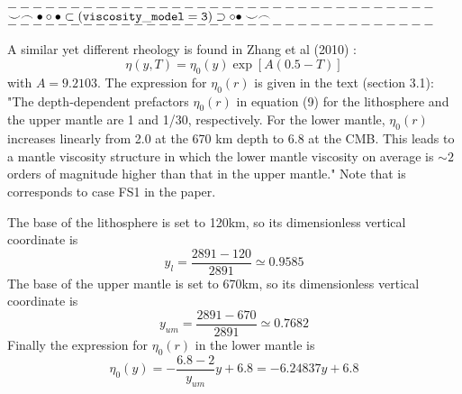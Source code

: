 












\newpage
\begin{center}
$----------------------------------$\\
$\smile \frown \bullet \circ \bullet \subset ( {\tt viscosity\_model=3} ) \supset \circ \bullet \smile \frown$\\
$----------------------------------$
\end{center}


A similar yet different rheology is found in Zhang et al (2010) \cite{zhzl10}:
\[
\eta(y,T) = \eta_0(y) \exp [A(0.5-T)]
\]
with $A=9.2103$. The expression for $\eta_0(r)$ is given in the text (section 3.1):
"The depth‐dependent prefactors $\eta_0(r)$ in equation (9)
for the lithosphere and the upper mantle are 1 and 1/30,
respectively. For the lower mantle, $\eta_0(r)$ increases
linearly from 2.0 at the 670 km depth to 6.8 at the CMB. This
leads to a mantle viscosity structure in which the lower mantle
viscosity on average is $\sim 2$ orders of magnitude higher than
that in the upper mantle." Note that is corresponds to case FS1 in the paper. 

The base of the lithosphere is set to 120km, so its dimensionless
vertical coordinate is 
\[
y_l = \frac{2891-120}{2891} \simeq 0.9585
\] 
The base of the upper mantle is set to 670km, so its dimensionless
vertical coordinate is 
\[
y_{um} = \frac{2891-670}{2891} \simeq 0.7682
\] 
Finally the expression for $\eta_0(r)$ in the lower mantle 
is 
\[
\eta_0(y)= - \frac{6.8-2}{y_{um}} y + 6.8 = -6.24837 y + 6.8
\]

